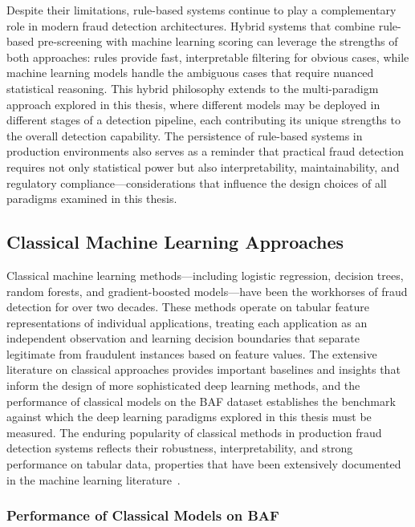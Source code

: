 Despite their limitations, rule-based systems continue to play a complementary
role in modern fraud detection architectures. Hybrid systems that combine rule-
based pre-screening with machine learning scoring can leverage the strengths of
both approaches: rules provide fast, interpretable filtering for obvious cases,
while machine learning models handle the ambiguous cases that require nuanced
statistical reasoning. This hybrid philosophy extends to the multi-paradigm
approach explored in this thesis, where different models may be deployed in
different stages of a detection pipeline, each contributing its unique strengths
to the overall detection capability. The persistence of rule-based systems in
production environments also serves as a reminder that practical fraud detection
requires not only statistical power but also interpretability, maintainability,
and regulatory compliance---considerations that influence the design choices of
all paradigms examined in this thesis.

\subsection{Classical Machine Learning Approaches}

Classical machine learning methods---including logistic regression, decision
trees, random forests, and gradient-boosted models---have been the workhorses of
fraud detection for over two decades. These methods operate on tabular feature
representations of individual applications, treating each application as an
independent observation and learning decision boundaries that separate
legitimate from fraudulent instances based on feature values. The extensive
literature on classical approaches provides important baselines and insights
that inform the design of more sophisticated deep learning methods, and the
performance of classical models on the BAF dataset establishes the benchmark
against which the deep learning paradigms explored in this thesis must be
measured. The enduring popularity of classical methods in production fraud
detection systems reflects their robustness, interpretability, and strong
performance on tabular data, properties that have been extensively documented in
the machine learning literature~\cite{grinsztajn2022tree}.

\subsubsection{Performance of Classical Models on BAF}

